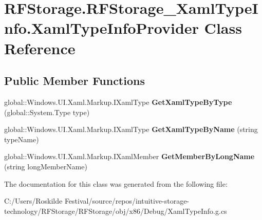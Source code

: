 \hypertarget{class_r_f_storage_1_1_r_f_storage___xaml_type_info_1_1_xaml_type_info_provider}{}\section{R\+F\+Storage.\+R\+F\+Storage\+\_\+\+Xaml\+Type\+Info.\+Xaml\+Type\+Info\+Provider Class Reference}
\label{class_r_f_storage_1_1_r_f_storage___xaml_type_info_1_1_xaml_type_info_provider}
\subsection*{Public Member Functions}
\begin{DoxyCompactItemize}
\item 
\mbox{\label{class_r_f_storage_1_1_r_f_storage___xaml_type_info_1_1_xaml_type_info_provider_af7658c874e266cd4866d15b7157f3da8}} 
global\+::\+Windows.\+U\+I.\+Xaml.\+Markup.\+I\+Xaml\+Type {\bfseries Get\+Xaml\+Type\+By\+Type} (global\+::\+System.\+Type type)
\item 
\mbox{\label{class_r_f_storage_1_1_r_f_storage___xaml_type_info_1_1_xaml_type_info_provider_a800eef5554a5dbd8914eaebf883c4afa}} 
global\+::\+Windows.\+U\+I.\+Xaml.\+Markup.\+I\+Xaml\+Type {\bfseries Get\+Xaml\+Type\+By\+Name} (string type\+Name)
\item 
\mbox{\label{class_r_f_storage_1_1_r_f_storage___xaml_type_info_1_1_xaml_type_info_provider_a9101b0a1303b7b1a4891a3e8988225d2}} 
global\+::\+Windows.\+U\+I.\+Xaml.\+Markup.\+I\+Xaml\+Member {\bfseries Get\+Member\+By\+Long\+Name} (string long\+Member\+Name)
\end{DoxyCompactItemize}


The documentation for this class was generated from the following file\+:\begin{DoxyCompactItemize}
\item 
C\+:/\+Users/\+Roskilde Festival/source/repos/intuitive-\/storage-\/technology/\+R\+F\+Storage/\+R\+F\+Storage/obj/x86/\+Debug/Xaml\+Type\+Info.\+g.\+cs\end{DoxyCompactItemize}
